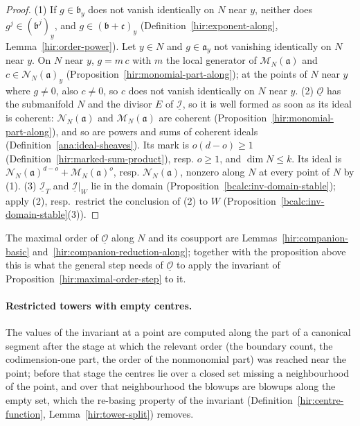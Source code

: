 \begin{proof}
\leanok
(1) If \(g\in\mathfrak b_y\) does not vanish identically on \(N\) near \(y\), neither does \(g^j\in(\mathfrak b^j)_y\), and \(g\in(\mathfrak b+\mathfrak c)_y\)
(Definition~\ref{hir:exponent-along}, Lemma~\ref{hir:order-power}). Let \(y\in N\) and \(g\in\mathfrak a_y\) not vanishing identically on \(N\) near \(y\). On \(N\) near \(y\),
\(g=m\,c\) with \(m\) the local generator of \(\mathcal M_N(\mathfrak a)\) and \(c\in\mathcal N_N(\mathfrak a)_y\) (Proposition~\ref{hir:monomial-part-along}); at the points
of \(N\) near \(y\) where \(g\ne0\), also \(c\ne0\), so \(c\) does not vanish identically on \(N\) near \(y\).
(2) \(\underline{\mathcal O}\) has the submanifold \(N\) and the divisor \(E\) of \(\underline{\mathcal I}\), so it is well formed as soon as its ideal is coherent:
\(\mathcal N_N(\mathfrak a)\) and \(\mathcal M_N(\mathfrak a)\) are coherent (Proposition~\ref{hir:monomial-part-along}), and so are powers and sums of coherent ideals
(Definition~\ref{ana:ideal-sheaves}). Its mark is \(o(d-o)\ge1\) (Definition~\ref{hir:marked-sum-product}), resp. \(o\ge1\), and \(\dim N\le k\). Its ideal is
\(\mathcal N_N(\mathfrak a)^{d-o}+\mathcal M_N(\mathfrak a)^{o}\), resp. \(\mathcal N_N(\mathfrak a)\), nonzero along \(N\) at every point of \(N\) by (1).
(3) \(\underline{\mathcal I}_T\) and \(\underline{\mathcal I}|_W\) lie in the domain (Proposition~\ref{bcalc:inv-domain-stable}); apply (2), resp.\ restrict the conclusion of (2) to \(W\)
(Proposition~\ref{bcalc:inv-domain-stable}(3)).
\end{proof}
The maximal order of \(\underline{\mathcal O}\) along \(N\) and its cosupport are Lemmas~\ref{hir:companion-basic} and~\ref{hir:companion-reduction-along}; together with the
proposition above this is what the general step needs of \(\underline{\mathcal O}\) to apply the invariant of Proposition~\ref{hir:maximal-order-step} to it.

\paragraph{Restricted towers with empty centres.} The values of the invariant at a point are computed along the part of a canonical segment after the
stage at which the relevant order (the boundary count, the codimension-one part, the order of the nonmonomial part) was reached near the point; before
that stage the centres lie over a closed set missing a neighbourhood of the point, and over that neighbourhood the blowups are blowups along the empty
set, which the re-basing property of the invariant (Definition~\ref{hir:centre-function}, Lemma~\ref{hir:tower-split}) removes.

